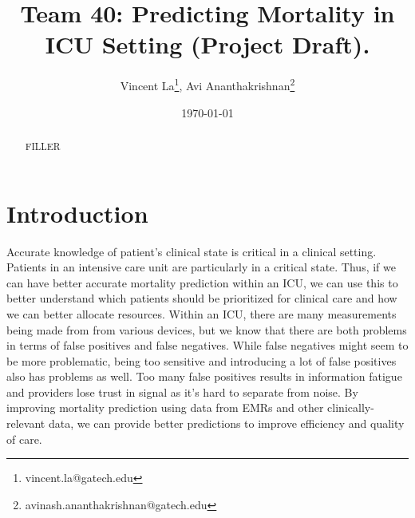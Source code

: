 \documentclass[12pt, final]{article}
\renewcommand{\thefootnote}{$\star$}
\begin{document}
\title{Team 40: Predicting Mortality in ICU Setting (Project Draft).}

\date{\today}

\renewcommand{\thefootnote}{$\dag$}
\author{Vincent La\footnote{vincent.la@gatech.edu}, Avi Ananthakrishnan\footnote{avinash.ananthakrishnan@gatech.edu}}

\maketitle

\begin{abstract}
FILLER
\end{abstract} 

\newpage
\renewcommand{\thefootnote}{\number\value{footnote}} 
\section{Introduction} \label{Introduction}
Accurate knowledge of patient's clinical state is critical in a clinical setting. Patients in an intensive care unit are particularly in a critical state. Thus, if we can have better accurate mortality prediction within an ICU, we can use this to better understand which patients should be prioritized for clinical care and how we can better allocate resources. Within an ICU, there are many measurements being made from from various devices, but we know that there are both problems in terms of false positives and false negatives. While false negatives might seem to be more problematic, being too sensitive and introducing a lot of false positives also has problems as well. Too many false positives results in information fatigue and providers lose trust in signal as it's hard to separate from noise. By improving mortality prediction using data from EMRs and other clinically-relevant data, we can provide better predictions to improve efficiency and quality of care.
\end{document}
